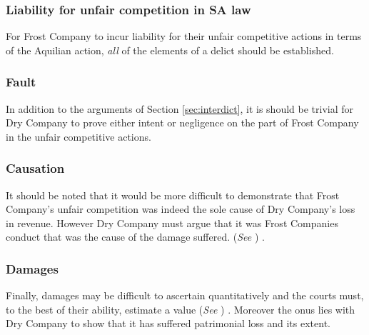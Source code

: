 \documentclass[11pt]{article}
\begin{document}
\subsubsection{Liability for unfair competition in SA law}
\label{sec:org7b89c31}
For Frost Company to incur liability for their unfair competitive actions in
terms of the Aquilian action, \emph{all} of the elements of a delict should be
established.

\subsubsection{Fault}
\label{sec:org64e3f57}
In addition to the arguments of Section \ref{sec:interdict}, it is should be
trivial for Dry Company to prove either intent or negligence on the part of
Frost Company in the unfair competitive actions.

\subsubsection{Causation}
\label{sec:org9ddbd10}
It should be noted that it would be more difficult to demonstrate that Frost
Company's unfair competition was indeed the sole cause of Dry Company's loss in
revenue. However Dry Company must argue that it was Frost Companies conduct that
was the cause of the damage suffered. (\emph{See}
) \cite{steyn64_geary_v_gove}.

\subsubsection{Damages}
\label{sec:orgf7a4de7}
Finally, damages may be difficult to ascertain quantitatively and the courts
must, to the best of their ability, estimate a value (\emph{See}
)
\cite{clayden55_int_tobaco_v_united_tobaco}. Moreover the onus lies with Dry
Company to show that it has suffered patrimonial loss and its extent.

\printbibliography
\end{document}
